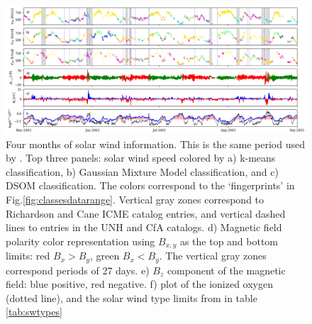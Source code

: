 \documentclass[utf8]{frontiersSCNS} %
\begin{document}
\begin{figure}[h!]
	\begin{center}
		\includegraphics[width=18cm]{Roberts/timeseries}%
	\end{center}
	\caption{Four months of solar wind information. This is the same period used by \citep{Roberts2020}. Top three panels: solar wind speed colored by a) k-means classification, b) Gaussian Mixture Model classification, and c) DSOM classification. The colors correspond to the `fingerprints' in Fig.\ref{fig:classesdatarange}. Vertical gray zones correspond to Richardson and Cane ICME catalog entries, and vertical dashed lines to entries in the UNH and CfA catalogs. d) Magnetic field polarity color representation using $B_{x,y}$ as the top and bottom limits: red $B_x>B_y$, green $B_x<B_y$. The vertical gray zones correspond periods of 27 days. e) $B_z$ component of the magnetic field: blue positive, red negative. f) plot of the ionized oxygen (dotted line), and the solar wind type limits from \citep{Zhao2009} in table \ref{tab:swtypes}}\label{fig:timeseries}
\end{figure}
\end{document}
